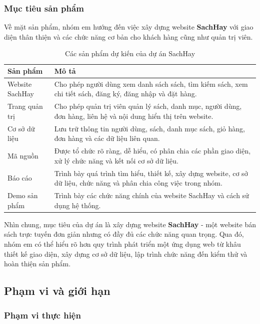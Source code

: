 \subsubsection{Mục tiêu sản phẩm}

Về mặt sản phẩm, nhóm em hướng đến việc xây dựng website \textbf{SachHay} với giao diện thân thiện và các chức năng cơ bản cho khách hàng cũng như quản trị viên.

\begin{table}[H]
	\centering
	\begin{tabular}{|p{4cm}|p{10cm}|}
		\hline
		\textbf{Sản phẩm} & \textbf{Mô tả} \\
		\hline
		Website SachHay & Cho phép người dùng xem danh sách sách, tìm kiếm sách, xem chi tiết sách, đăng ký, đăng nhập và đặt hàng. \\
		\hline
		Trang quản trị & Cho phép quản trị viên quản lý sách, danh mục, người dùng, đơn hàng, liên hệ và nội dung hiển thị trên website. \\
		\hline
		Cơ sở dữ liệu & Lưu trữ thông tin người dùng, sách, danh mục sách, giỏ hàng, đơn hàng và các dữ liệu liên quan. \\
		\hline
		Mã nguồn & Được tổ chức rõ ràng, dễ hiểu, có phân chia các phần giao diện, xử lý chức năng và kết nối cơ sở dữ liệu. \\
		\hline
		Báo cáo & Trình bày quá trình tìm hiểu, thiết kế, xây dựng website, cơ sở dữ liệu, chức năng và phân chia công việc trong nhóm. \\
		\hline
		Demo sản phẩm & Trình bày các chức năng chính của website SachHay và cách sử dụng hệ thống. \\
		\hline
	\end{tabular}
	\caption{Các sản phẩm dự kiến của dự án SachHay}
	\label{tab:sachhay-project-goals}
\end{table}

Nhìn chung, mục tiêu của dự án là xây dựng website \textbf{SachHay} - một website bán sách trực tuyến đơn giản nhưng có đầy đủ các chức năng quan trọng. Qua đó, nhóm em có thể hiểu rõ hơn quy trình phát triển một ứng dụng web từ khâu thiết kế giao diện, xây dựng cơ sở dữ liệu, lập trình chức năng đến kiểm thử và hoàn thiện sản phẩm.
\subsection{Phạm vi và giới hạn}

\subsubsection{Phạm vi thực hiện}

